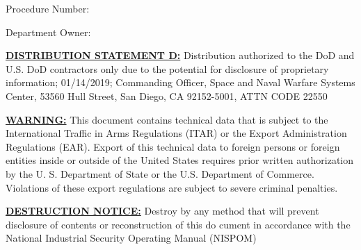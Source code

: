 \begin{titlepage}

    \vspace*{1in}

    \begin{flushright}
        {\Huge\textbf{\titleStr}}

        \vspace*{1ex}

        {\Large Procedure Number:~\procedureNumber}

        \vspace*{1ex}

        {\Large Department Owner:~\departmentOwner}
    \end{flushright}
    \vspace{4in}

    \textbf{\underline{DISTRIBUTION STATEMENT D:}} Distribution authorized to the DoD and U.S. DoD contractors only due to the potential for disclosure of proprietary information; 01/14/2019; Commanding Officer, Space and Naval Warfare Systems Center, 53560 Hull Street, San Diego, CA 92152-5001, ATTN CODE 22550

    \textbf{\underline{WARNING:}} This document contains technical data that is subject to the International Traffic in Arms Regulations (ITAR) or the Export Administration Regulations (EAR). Export of this technical data to foreign persons or foreign entities inside or outside of the United States requires prior written authorization by the U. S. Department of State or the U.S. Department of Commerce. Violations of these export regulations are subject to severe criminal penalties.

    \textbf{\underline{DESTRUCTION NOTICE:}} Destroy by any method that will prevent disclosure of contents or reconstruction of this do cument in accordance with the National Industrial Security Operating Manual (NISPOM)


\end{titlepage}
